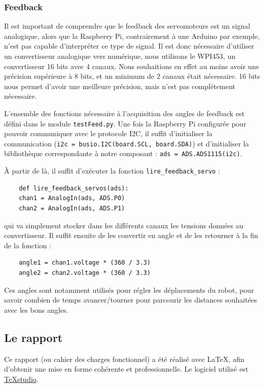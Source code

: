 \documentclass[a4paper,12pt]{report}  %
\begin{document}
\subsubsection{Feedback}

Il est important de comprendre que le feedback des servomoteurs est un signal analogique, alors que la Raspberry Pi, contrairement à une Arduino par exemple, n’est pas capable d’interpréter ce type de signal. Il est donc nécessaire d’utiliser un convertisseur analogique vers numérique, nous utilisons le WPI453, un convertisseur 16 bits avec 4 canaux. Nous souhaitions en effet au moins avoir une précision supérieure à 8 bits, et un minimum de 2 canaux était nécessaire. 16 bits nous permet d’avoir une meilleure précision, mais n’est pas complètement nécessaire.

L’ensemble des fonctions nécessaire à l’acquisition des angles de feedback est défini dans le module \texttt{testFeed.py}. Une fois la Raspberry Pi configurée pour pouvoir communiquer avec le protocole I2C, il suffit d’initialiser la communication (\texttt{i2c = busio.I2C(board.SCL, board.SDA)}) et d’initialiser la bibliothèque correspondante à notre composant : \texttt{ads = ADS.ADS1115(i2c)}.

À partir de là, il suffit d’exécuter la fonction \texttt{lire\_feedback\_servo} : 

\begin{lstlisting}
	def lire_feedback_servos(ads):
	chan1 = AnalogIn(ads, ADS.P0)
	chan2 = AnalogIn(ads, ADS.P1)
\end{lstlisting}

qui va simplement stocker dans les différents canaux les tensions données au convertisseur. Il suffit ensuite de les convertir en angle et de les retourner à la fin de la fonction :

\begin{lstlisting}
	angle1 = chan1.voltage * (360 / 3.3)
	angle2 = chan2.voltage * (360 / 3.3)
\end{lstlisting}

Ces angles sont notamment utilisés pour régler les déplacements du robot, pour savoir combien de temps avancer/tourner pour parcourir les distances souhaitées avec les bons angles.

\subsection{Le rapport}

Ce rapport (ou cahier des charges fonctionnel) a été réalisé avec \LaTeX, afin d'obtenir une mise en forme cohérente et professionnelle. Le logiciel utilisé est \href{https://flathub.org/apps/org.texstudio.TeXstudio}{TeXstudio}. 
\end{document}
